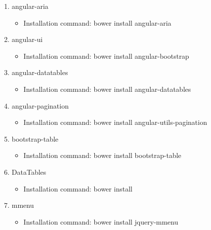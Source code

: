 \documentclass[a4paper,12pt,oneside]{book}
\begin{document}
\begin{enumerate}
\begin{itemize}
\begin{enumerate}
\begin{itemize}
                        \end{itemize}
                    \item{angular-aria}
                        \begin{itemize}
                            \item{Installation command: bower install angular-aria}
                        \end{itemize}
                    \item{angular-ui}
                        \begin{itemize}
                            \item{Installation command: bower install angular-bootstrap}
                        \end{itemize}
                    \item{angular-datatables}
                        \begin{itemize}
                            \item{Installation command: bower install angular-datatables}
                        \end{itemize}
                    \item{angular-pagination}
                        \begin{itemize}
                            \item{Installation command: bower install angular-utils-pagination}
                        \end{itemize}
                \item{bootstrap-table}
                    \begin{itemize}
                        \item{Installation command: bower install bootstrap-table}
                    \end{itemize}
                \item{DataTables}
                    \begin{itemize}
                        \item{Installation command: bower install }
                    \end{itemize}
                \item{mmenu}
                    \begin{itemize}
                        \item{Installation command: bower install jquery-mmenu}
                    \end{itemize}
            \end{enumerate}
    \end{itemize}
  


\end{enumerate}
\end{document}
